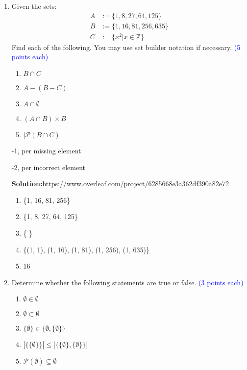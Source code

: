 \documentclass{article}
\newcommand{\pte}[1]{\textcolor{blue}{(#1 points each)}}
\newenvironment{solution}
{
\par
\color{blue}
\textbf{Solution:}https://www.overleaf.com/project/6285668e3a362df390a82e72
}
{
\par
}
\newenvironment{rubric}
{
\par
\begin{spacing}{.6}
\begin{itshape}
\color{red}

}
{
\end{itshape}
\end{spacing}
\par
}
\begin{document}
\clearpage
\begin{enumerate}
\item Given the sets: 
\begin{align*}
    A &:= \{1,8,27,64,125\}\\
    B &:= \{1,16,81,256,635\}\\
    C &:= \{x^2 | x \in \mathbb{Z}\}\
\end{align*}
Find each of the following. You may use set builder notation if necessary.
\pte 5

\begin{enumerate}
    \item $B \cap C$
    \item $A-(B-C)$
    \item $A \cap \emptyset$
    \item $(A \cap B) \times B$
    \item $|\mathcal{P}(B\cap C)|$
\end{enumerate}

\begin{rubric}
-1, per missing element

-2, per incorrect element

\end{rubric}

\begin{solution}
\begin{enumerate}
    \item \{1, 16, 81, 256\}
    \item \{1, 8, 27, 64, 125\}
    \item \{ \}
    \item \{(1, 1), (1, 16), (1, 81), (1, 256), (1, 635)\}
    \item 16
\end{enumerate}
\end{solution}

\item Determine whether the following statements are true or false. \pte{3}

\begin{enumerate}
    \item $\emptyset \in \emptyset$
    \item $\emptyset \subset \emptyset$
    \item $\{\emptyset\} \in \{\emptyset,\{\emptyset\}\}$
    \item $|\{\{\emptyset\}\}| \leq |\{\{\emptyset\}, \{\emptyset\}\}|$
    \item $\mathcal{P}(\emptyset) \subseteq \emptyset$
\end{enumerate}


\end{enumerate}
\end{document}
